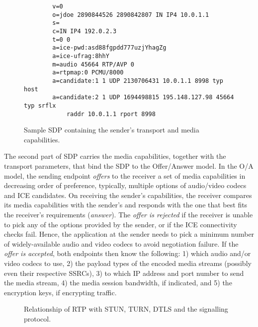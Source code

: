 
\begin{figure}[!h]
{\small
\begin{verbatim}
        v=0
        o=jdoe 2890844526 2890842807 IN IP4 10.0.1.1
        s=
        c=IN IP4 192.0.2.3
        t=0 0
        a=ice-pwd:asd88fgpdd777uzjYhagZg
        a=ice-ufrag:8hhY
        m=audio 45664 RTP/AVP 0
        a=rtpmap:0 PCMU/8000
        a=candidate:1 1 UDP 2130706431 10.0.1.1 8998 typ host
        a=candidate:2 1 UDP 1694498815 195.148.127.98 45664 typ srflx 
            raddr 10.0.1.1 rport 8998
\end{verbatim}
}
\caption{Sample SDP containing the sender's transport and media capabilities.}
\label{fig:3:sdp}
\end{figure}

The second part of SDP carries the media capabilities, together with the 
transport parameters, that bind the SDP to the Offer/Answer model. In the O/A
model, the sending endpoint \emph{offers} to the receiver a set of media
capabilities in decreasing order of preference, typically, multiple options of
audio/video codecs and ICE candidates. On receiving the sender's capabilities,
the receiver compares its media capabilities with the sender's and responds
with the one that best fits the receiver's requirements (\emph{answer}). The
\emph{offer is rejected} if the receiver is unable to pick any
of the options provided by the sender, or if the ICE connectivity checks fail.
Hence, the application at the sender needs to pick a minimum number of widely-available 
audio and video codecs to avoid negotiation failure. If the
\emph{offer is accepted}, both endpoints then know the following: 1) which
audio and/or video codecs to use, 2) the payload types of the encoded media
streams (possibly even their respective SSRCs), 3) to which IP address and
port number to send the media stream, 4) the media session bandwidth, if
indicated, and 5) the encryption keys, if encrypting traffic.

\begin{figure}[!t]
\caption{Relationship of RTP with STUN, TURN, DTLS and the signalling protocol.}
\label{fig:3:rtp-stack}
\end{figure}

